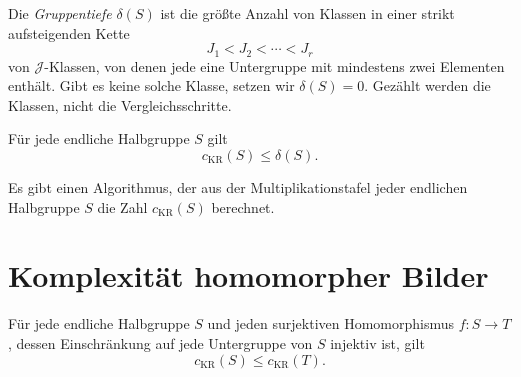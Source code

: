 \begin{definition}[Gruppentiefe]
Die \emph{Gruppentiefe} $\delta(S)$ ist die größte Anzahl von Klassen
in einer strikt aufsteigenden Kette
\[
 J_1<J_2<\cdots<J_r
\]
von $\mathcal J$-Klassen, von denen jede eine Untergruppe mit mindestens
zwei Elementen enthält. Gibt es keine solche Klasse, setzen wir
$\delta(S)=0$. Gezählt werden die Klassen, nicht die Vergleichsschritte.
\end{definition}

\begin{theorem}
\label{thm:b37-guide-depth}
Für jede endliche Halbgruppe $S$ gilt
\[
 c_{\mathrm{KR}}(S)\leq\delta(S).
\]
\cite{margolis2025}
\end{theorem}

\begin{theorem}
\label{thm:b37-guide-complexity-decidability}
Es gibt einen Algorithmus, der aus der Multiplikationstafel jeder
endlichen Halbgruppe $S$ die Zahl $c_{\mathrm{KR}}(S)$ berechnet.
\cite{margolis2024,margolis2025}
\end{theorem}

\section{Komplexität homomorpher Bilder}

\begin{theorem}
\label{thm:b37-guide-fundamental-complexity}
Für jede endliche Halbgruppe $S$ und jeden surjektiven Homomorphismus
$f:S\to T$, dessen Einschränkung auf jede Untergruppe von $S$
injektiv ist, gilt
\[
 c_{\mathrm{KR}}(S)\leq c_{\mathrm{KR}}(T).
\]
\cite[Satz~4.9.1]{RhodesSteinberg2009}
\end{theorem}

